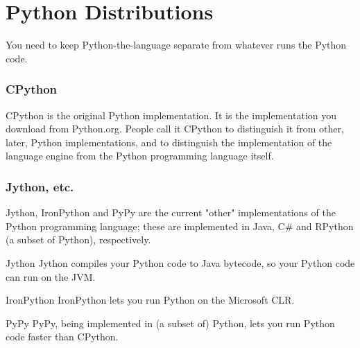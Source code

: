 \documentclass{../py-lecture}
\begin{document}
\section{Python Distributions}

\begin{frame}
  \begin{block}{}
    You need to keep Python-the-language separate from whatever runs the Python code.
  \end{block}
\end{frame}

\begin{frame}
  \frametitle{CPython}
  \begin{block}{}
    CPython is the original Python implementation.
    It is the implementation you download from Python.org.
    People call it CPython to distinguish it from other, later, Python implementations, and to distinguish the implementation of the language engine from the Python programming language itself.
  \end{block}
\end{frame}

\begin{frame}
  \frametitle{Jython, etc.}
  \begin{block}{}
    Jython, IronPython and PyPy are the current "other" implementations of the Python programming language;
    these are implemented in Java, C\# and RPython (a subset of Python), respectively.
  \end{block}
  \begin{block}{Jython}
    Jython compiles your Python code to Java bytecode, so your Python code can run on the JVM.
  \end{block}
  \begin{block}{IronPython}
    IronPython lets you run Python on the Microsoft CLR.
  \end{block}
  \begin{block}{PyPy}
    PyPy, being implemented in (a subset of) Python, lets you run Python code faster than CPython.
  \end{block}
\end{frame}
\end{document}
